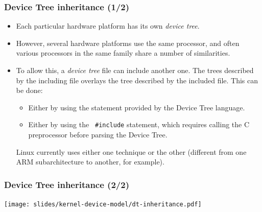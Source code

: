 \begin{frame}
  \frametitle{Device Tree inheritance (1/2)}
  \begin{itemize}
  \item Each particular hardware platform has its own {\em device tree}.
  \item However, several hardware platforms use the same processor,
    and often various processors in the same family share a number of
    similarities.
  \item To allow this, a {\em device tree} file can include another
    one. The trees described by the including file overlays the tree
    described by the included file. This can be done:
    \begin{itemize}
       \item Either by using the  statement
         provided by the Device Tree language.
       \item Either by using the {\tt
         \#include} statement, which requires calling the C
         preprocessor before parsing the Device Tree.
    \end{itemize}
    Linux currently uses either one technique or the other
    (different from one ARM subarchitecture to another, for example).
  \end{itemize}
\end{frame}

\begin{frame}
  \frametitle{Device Tree inheritance (2/2)}
  \begin{center}
    \texttt{[image: slides/kernel-device-model/dt-inheritance.pdf]}
  \end{center}
\end{frame}

